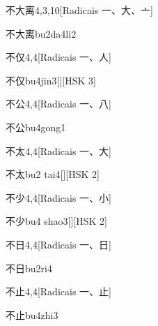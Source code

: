 \begin{entry}{不大离}{4,3,10}[Radicais ⼀、⼤、⼇]
  \begin{phonetics}{不大离}{bu2da4li2}
  \end{phonetics}
\end{entry}

\begin{entry}{不仅}{4,4}[Radicais ⼀、⼈]
  \begin{phonetics}{不仅}{bu4jin3}[][HSK 3]
  \end{phonetics}
\end{entry}

\begin{entry}{不公}{4,4}[Radicais ⼀、⼋]
  \begin{phonetics}{不公}{bu4gong1}
  \end{phonetics}
\end{entry}

\begin{entry}{不太}{4,4}[Radicais ⼀、⼤]
  \begin{phonetics}{不太}{bu2 tai4}[][HSK 2]
  \end{phonetics}
\end{entry}

\begin{entry}{不少}{4,4}[Radicais ⼀、⼩]
  \begin{phonetics}{不少}{bu4 shao3}[][HSK 2]
  \end{phonetics}
\end{entry}

\begin{entry}{不日}{4,4}[Radicais ⼀、⽇]
  \begin{phonetics}{不日}{bu2ri4}
  \end{phonetics}
\end{entry}

\begin{entry}{不止}{4,4}[Radicais ⼀、⽌]
  \begin{phonetics}{不止}{bu4zhi3}
  \end{phonetics}
\end{entry}


